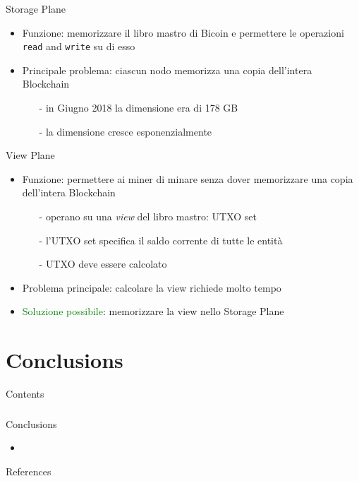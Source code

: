 \documentclass{beamer}
\begin{document}
  
  
  
  \begin{frame}{Storage Plane}
      \begin{itemize}
          \item Funzione: memorizzare il libro mastro di Bicoin e permettere le operazioni \texttt{read} and \texttt{write} su di esso
          \item Principale problema: ciascun nodo memorizza una copia dell'intera Blockchain
          \begin{itemize}
              \item[-] in Giugno 2018 la dimensione era di 178 GB \cite{statista}
              \item[-] la dimensione cresce esponenzialmente
          \end{itemize}
      \end{itemize}
  \end{frame}
  
  
  
  
  \begin{frame}{View Plane}
      \begin{itemize}
          \item Funzione: permettere ai miner di minare senza dover memorizzare una copia dell'intera Blockchain
          \begin{itemize}
              \item[-] operano su una \emph{view} del libro mastro: UTXO set
              \item[-] l'UTXO set specifica il saldo corrente di tutte le entità
              \item[-] UTXO deve essere calcolato
          \end{itemize}
          \item Problema principale: calcolare la view richiede molto tempo
          \item \textcolor{green}{Soluzione possibile}: memorizzare la view nello Storage Plane
      \end{itemize}
  \end{frame}
  
  
  
  
  \section{Conclusions}
  \begin{frame}{Contents}
      \frametitle{\contentsname}
    \begin{multicols}{2}
    \end{multicols}
  \end{frame}
  
  
  
  \begin{frame}{Conclusions}
      \begin{itemize}
          \item 
      \end{itemize}
  \end{frame}
  
  
  
  
  


  \begin{frame}[allowframebreaks]{References}
    \printbibliography
  \end{frame}
\end{document}
